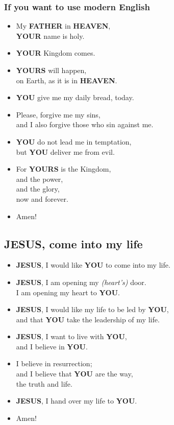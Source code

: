 \documentclass[12pt,a4paper]{article}
\newcommand{\Father}[0]{\textbf{FATHER}}
\newcommand{\Heaven}[0]{\textbf{HEAVEN}}
\newcommand{\Jesus}[0]{\textbf{JESUS}}
\newcommand{\You}[0]{\textbf{YOU}}
\newcommand{\Your}[0]{\textbf{YOUR}}
\newcommand{\Yours}[0]{\textbf{YOURS}}
\begin{document}
	\subsubsection{If you want to use modern English}
		\begin{itemize}[nosep]
			\item	My {\Father} in {\Heaven},
					\\
					{\Your} name is holy.
			\item	{\Your} Kingdom comes.
			\item	{{\Yours} will happen},
					\\
					on Earth,
					as it is in {\Heaven}.
			\item	{\You} give me my daily bread,
					today.
			\item	Please,
					forgive me my sins,
					\\
					and I also forgive those who sin against me.
			\item	{\You} do not lead me in temptation,
					\\
					but {\You} deliver me from evil.
			\item	For {\Yours} is the Kingdom,
					\\
					and the power,
					\\
					and the glory,
					\\
					now and forever.
			\item	Amen!
		\end{itemize}

	\subsection{{\Jesus}, come into my life}
		\begin{itemize}[nosep]
			\item	{\Jesus},
					I would like {\You} to come into my life.
			\item	{\Jesus},
					I am opening my \textit{(heart's)} door.
					\\
					I am opening my heart to {\You}.
			\item	{\Jesus},
					I would like my life to be led by {\You},
					\\
					and that {\You} take the leadership of my life.
			\item	{\Jesus},
					I want to live with {\You},
					\\
					and I believe in {\You}.
			\item	I believe in resurrection;
					\\
					and I believe that {\You} are the way,
					\\
					the truth and life.
			\item	{\Jesus},
					I hand over my life to {\You}.
			\item	Amen!
		\end{itemize}
\end{document}
